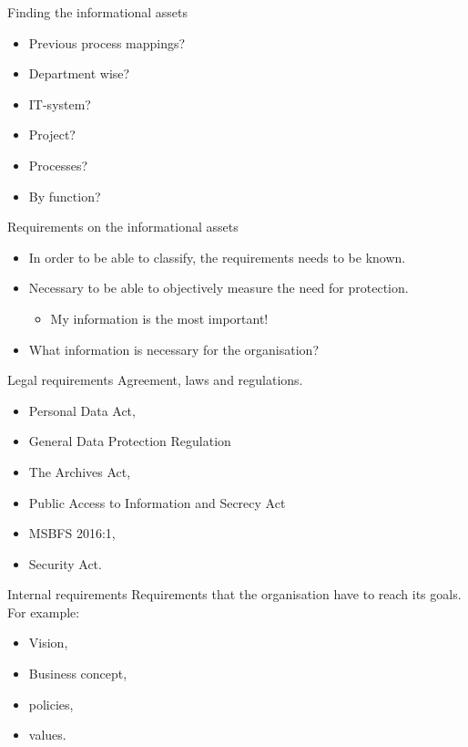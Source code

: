 \documentclass{beamer}
\begin{document}
\begin{frame}{Finding the informational assets}
  \begin{itemize}
    \item Previous process mappings?
    \item Department wise?
    \item IT-system?
    \item Project?
    \item Processes?
    \item By function?
  \end{itemize}
\end{frame}

\begin{frame}{Requirements on the informational assets}
  \begin{itemize}
    \item In order to be able to classify, the requirements needs to be known.

    \item Necessary to be able to objectively measure the need for protection.
      \begin{itemize}
        \item My information is the most important!
      \end{itemize}

    \item What information is necessary for the organisation?

  \end{itemize}
\end{frame}

\begin{frame}{Legal requirements}
  Agreement, laws and regulations.
  \begin{itemize}
    \item Personal Data Act,
    \item General Data Protection Regulation
    \item The Archives Act,
    \item Public Access to Information and Secrecy Act
    \item MSBFS 2016:1,
    \item Security Act.
  \end{itemize}
\end{frame}

\begin{frame}{Internal requirements}
  Requirements that the organisation have to reach its goals.
  For example:
  \begin{itemize}
    \item Vision,
    \item Business concept,
    \item policies,
    \item values.
  \end{itemize}
\end{frame}
\end{document}
